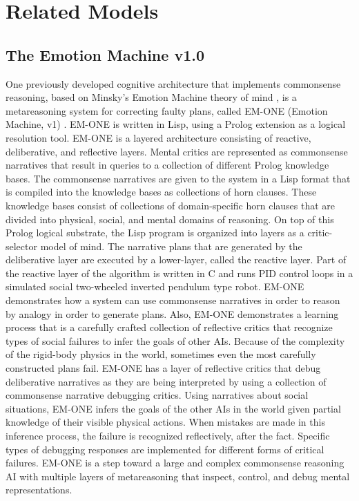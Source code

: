 \chapter{Related Models}
\label{chapter:related_models}

\section{The Emotion Machine v1.0}

One previously developed cognitive architecture that implements
commonsense reasoning, based on Minsky's Emotion Machine theory of
mind \cite[]{minsky:2006}, is a metareasoning system for correcting
faulty plans, called EM-ONE (Emotion Machine, v1)
\cite[]{singh:2005b}. EM-ONE is written in Lisp, using a Prolog
extension as a logical resolution tool. EM-ONE is a layered
architecture consisting of reactive, deliberative, and reflective
layers. Mental critics are represented as commonsense narratives that
result in queries to a collection of different Prolog knowledge
bases. The commonsense narratives are given to the system in a Lisp
format that is compiled into the knowledge bases as collections of
horn clauses. These knowledge bases consist of collections of
domain-specific horn clauses that are divided into physical, social,
and mental domains of reasoning. On top of this Prolog logical
substrate, the Lisp program is organized into layers as a
critic-selector model of mind. The narrative plans that are generated
by the deliberative layer are executed by a lower-layer, called the
reactive layer. Part of the reactive layer of the algorithm is written
in C and runs PID control loops in a simulated social two-wheeled
inverted pendulum type robot. EM-ONE demonstrates how a system can use
commonsense narratives in order to reason by analogy in order to
generate plans. Also, EM-ONE demonstrates a learning process that is a
carefully crafted collection of reflective critics that recognize
types of social failures to infer the goals of other AIs.  Because of
the complexity of the rigid-body physics in the world, sometimes even
the most carefully constructed plans fail. EM-ONE has a layer of
reflective critics that debug deliberative narratives as they are
being interpreted by using a collection of commonsense narrative
debugging critics.  Using narratives about social situations, EM-ONE
infers the goals of the other AIs in the world given partial knowledge
of their visible physical actions. When mistakes are made in this
inference process, the failure is recognized reflectively, after the
fact. Specific types of debugging responses are implemented for
different forms of critical failures. EM-ONE is a step toward a large
and complex commonsense reasoning AI with multiple layers of
metareasoning that inspect, control, and debug mental representations.

